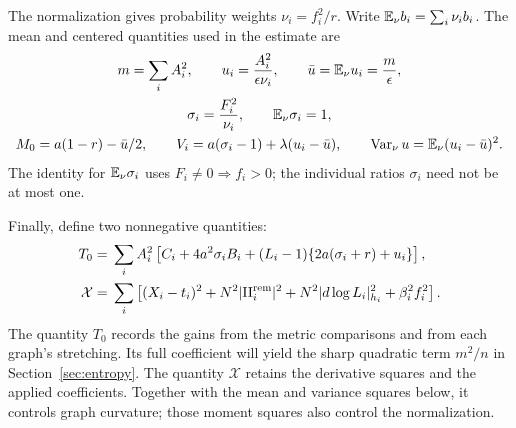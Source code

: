 The normalization gives probability weights \(\nu_i=f_i^2/r\).
Write \(\mathbb E_\nu b_i=\sum_i\nu_i b_i\).  The mean and centered
quantities used in the estimate are
\begin{equation}
 \begin{gathered}
 m=\sum_iA_i^2,\qquad
 u_i=\frac{A_i^2}{\epsilon\nu_i},\qquad
 \bar u=\mathbb E_\nu u_i=\frac m\epsilon,\\
 \sigma_i=\frac{F_i^2}{\nu_i},\qquad \mathbb E_\nu\sigma_i=1,\\
 M_0=a(1-r)-\bar u/2,\qquad
 V_i=a(\sigma_i-1)+\lambda(u_i-\bar u),\qquad
 \operatorname{Var}_\nu u=\mathbb E_\nu(u_i-\bar u)^2 .
 \end{gathered}
 \label{eq:sweep-statistics}
\end{equation}
The identity for \(\mathbb E_\nu\sigma_i\) uses
\(F_i\ne0\Rightarrow f_i>0\); the individual ratios \(\sigma_i\)
need not be at most one.

Finally, define two nonnegative quantities:
\begin{align}
 T_0={}&\sum_i A_i^2\left[
 C_i+4a^2\sigma_iB_i+(L_i-1)\{2a(\sigma_i+r)+u_i\}\right],
 \label{eq:sweep-T}\\
 \mathcal X={}&\sum_i\left[
 (X_i-t_i)^2+N^2|\mathrm{II}_i^{\mathrm{rem}}|^2
       +N^2|d\log L_i|_{h_i}^2+\beta_i^2f_i^2\right].
 \label{eq:sweep-X}
\end{align}
The quantity \(T_0\) records the gains from the metric comparisons
and from each graph's stretching.  Its full coefficient will yield
the sharp quadratic term \(m^2/n\) in Section~\ref{sec:entropy}.
The quantity \(\mathcal X\) retains the derivative squares and the
applied coefficients.  Together with the mean and variance squares
below, it controls graph curvature; those moment squares also control
the normalization.

